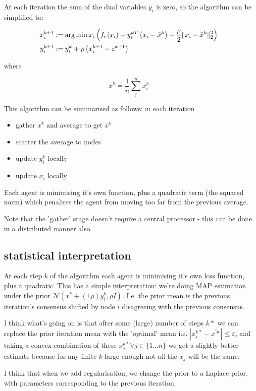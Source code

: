 \documentclass[titlepage]{article}
\begin{document}
At each iteration the sum of the dual variables \(y_i\) is zero, so the algorithm can be simplified to:

\begin{align}
x_i^{k+1} &:= \operatorname*{arg\,min}{x_i} \left(f_i\left( x_i \right) + y_i^{kT}\left(x_i-\bar{x}^k\right) + \frac{\rho}{2}\|x_i-\bar{x}^k\|_2^2\right)\\
y_i^{k+1} &:= y_i^{k} + \rho \left(x_i^{k+1} - z^{k+1} \right)
\label{simple_consensus_iterations}
\end{align}
 
where

\begin{equation}
\bar{x}^k = \frac{1}{n} \sum_i^n x_i^k
\end{equation}

This algorithm can be summarised as follows: in each iteration

\begin{itemize}
\item gather \(x^k\) and average to get \(\bar{x}^k\)
\item scatter the average to nodes
\item update \(y_i^k\) locally
\item update \(x_i\) locally
\end{itemize}

Each agent is minimising it's own function, plus a quadratic term (the squared norm) which penalises the agent from moving too far from the previous average.

Note that the 'gather' stage doesn't require a central processor - this can be done in a distributed manner also.

\subsection{statistical interpretation}
At each step \(k\) of the algorithm each agent is minimising it's own loss function, plus a quadratic.
This has a simple interpretation: we're doing MAP estimation under the prior \(\mathcal{N}\left(\bar{x}^{k} + \left(1\rho\right)y_i^k, \rho I\right)\). I.e. the prior mean is the previous iteration's consensus shifted by node \(i\) disagreeing with the previous consensus. 

I think what's going on is that after some (large) number of steps \(k*\) we can replace the prior iteration mean with the 'optimal' mean i.e. \(|x_i^{k*} - \bar{x*}| \leq \varepsilon \), and taking a convex combination of these \(x_j^{k*} \forall j \in \{1\ldots n\}\) we get a slightly better estimate because for any finite \(k\) large enough not all the \(x_j\) will be the same.

I think that when we add regularisation, we change the prior to a Laplace prior, with parameters corresponding to the previous iteration. 
\end{document}
